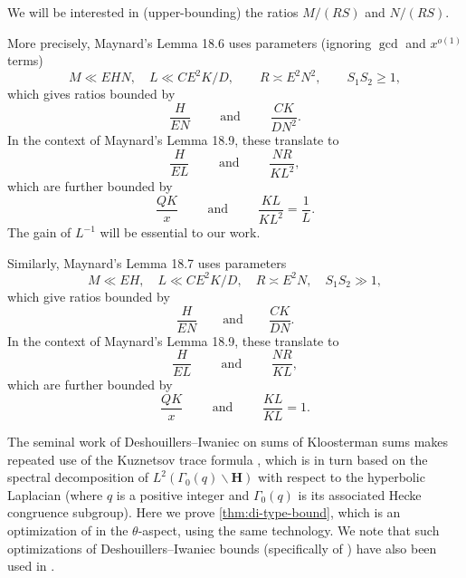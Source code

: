 \documentclass[reqno,11pt]{amsart}
\theoremstyle{definition}
\theoremstyle{remark}
\numberwithin{equation}{section}
\renewcommand{\H}{\mathbf{H}}
\begin{document}
We will be interested in (upper-bounding) the ratios $M/(RS)$ and $N/(RS)$.

More precisely, Maynard's Lemma 18.6 uses parameters (ignoring $\gcd$ and $x^{o(1)}$ terms)
\[
    M \ll EHN, \quad 
    L \ll CE^2K/D, 
    \qquad 
    R \asymp E^2 N^2,
    \qquad 
    S_1 S_2 \ge 1,
\]
which gives ratios bounded by
\[
    \frac{H}{EN}
    \qquad \text{ and } \qquad 
    \frac{CK}{DN^2}.
\]
In the context of Maynard's Lemma 18.9, these translate to
\[
    \frac{H}{EL}
    \qquad \text{ and } \qquad 
    \frac{NR}{KL^2},
\]
which are further bounded by
\begin{equation}\label{eq:ratios-6}
    \frac{QK}{x}
    \qquad \text{ and } \qquad 
    \frac{KL}{KL^2} = \frac{1}{L}.
\end{equation}
The gain of $L^{-1}$ will be essential to our work.

Similarly, Maynard's Lemma 18.7 uses parameters
\[
    M \ll EH, \quad 
    L \ll CE^2 K/D, \quad 
    R \asymp E^2 N, \quad 
    S_1S_2 \gg 1,
\]
which give ratios bounded by
\[
    \frac{H}{EN} 
    \qquad 
    \text{and} 
    \qquad 
    \frac{CK}{DN}.
\]
In the context of Maynard's Lemma 18.9, these translate to
\[
    \frac{H}{EL}
    \qquad 
    \text{ and }
    \qquad 
    \frac{NR}{KL},
\]
which are further bounded by
\begin{equation}\label{eq:ratios-7}
    \frac{QK}{x}
    \qquad \text{ and }
    \qquad 
    \frac{KL}{KL} = 1.
\end{equation}
\fi

The seminal work \cite{deshouillers1982kloosterman} of Deshouillers--Iwaniec on sums of Kloosterman sums makes repeated use of the Kuznetsov trace formula \cite{kuznetsov1980petersson,motohashi1997spectral}, which is in turn based on the spectral decomposition of $L^2(\Gamma_0(q) \backslash \H)$ with respect to the hyperbolic Laplacian (where $q$ is a positive integer and $\Gamma_0(q)$ is its associated Hecke congruence subgroup). Here we prove \cref{thm:di-type-bound}, which is an optimization of \cite[Theorem 11]{deshouillers1982kloosterman} in the $\theta$-aspect, using the same technology. We note that such optimizations of Deshouillers--Iwaniec bounds (specifically of \cite[Theorem 12]{deshouillers1982kloosterman}) have also been used in \cite{drappeau2023one}.
\end{document}
